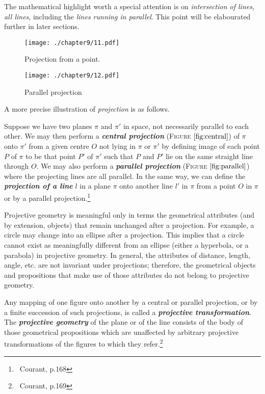 The mathematical highlight worth a special attention is on \textit{intersection of lines, all lines}, including the \textit{lines running in parallel}. This point will be elabourated further in later sections. 

\begin{figure}[htbp] %
\centering
\texttt{[image: ./chapter9/11.pdf]} 
\caption{Projection from a point.} 
\label{fig:central}
\end{figure}

\begin{figure}[htbp] %
\centering
\texttt{[image: ./chapter9/12.pdf]} 
\caption{Parallel projection }
\label{fig:parallel}
\end{figure}

A more precise illustration of \textit{projection} is as follows.
\begin{definition} 
Suppose we have two planes $\pi$ and $\pi'$ in space, not necessarily parallel to each other. We may then perform a \emph{\textbf{central projection}} \textsc{(Figure $\ref{fig:central}$)} of $\pi$ onto $\pi'$ from a given centre $O$ not lying in $\pi$ or $\pi'$ by defining image of each point $P$ of $\pi$ to be that point $P'$ of $\pi'$ such that $P$ and $P'$ lie on the same straight line through $O$. We may also perform a \emph{\textbf{parallel projection}} \textsc{(Figure $\ref{fig:parallel}$)} where the projecting lines are all parallel. In the same way, we can define the \emph{\textbf{projection of a line}} $l$ in a plane $\pi$ onto another line $l'$ in $\pi$ from a point $O$ in $\pi$ or by a parallel projection.\footnote{\ Courant, p.168} 
\end{definition}

Projective geometry is meaningful only in terms the geometrical attributes (and by extension, objects) that remain unchanged after a projection. For example, a circle may change into an ellipse after a projection. This implies that a circle cannot exist as meaningfully different from an ellipse (either a hyperbola, or a parabola) in projective geometry. In general, the attributes of distance, length, angle, etc. are not invariant under projections; therefore, the geometrical objects and propositions that make use of those attributes do not belong to projective geometry.



\begin{definition} Any mapping of one figure onto another by a central or parallel projection, or by a finite succession of such projections, is called a \emph{\textbf{projective transformation}}. The \emph{\textbf{projective geometry}} of the plane or of the line consists of the body of those geometrical propositions which are unaffected by arbitrary projective transformations of the figures to which they refer.\footnote{\ Courant, p.169} \end{definition}

